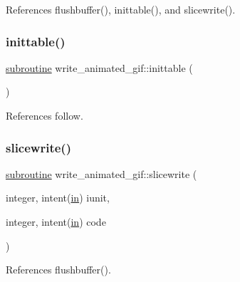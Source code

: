 References flushbuffer(), inittable(), and slicewrite().

\mbox{\label{M__writegif__animated_8f90_acd7274fbac8690a12be91b542378a4eb}} 
\subsubsection{\texorpdfstring{inittable()}{inittable()}}
{\footnotesize\ttfamily \hyperlink{M__stopwatch_83_8txt_acfbcff50169d691ff02d4a123ed70482}{subroutine} write\+\_\+animated\+\_\+gif\+::inittable (\begin{DoxyParamCaption}{ }\end{DoxyParamCaption})\hspace{0.3cm}{\ttfamily [private]}}



References follow.

\mbox{\label{M__writegif__animated_8f90_ac5c0245eea61f109cbf3ce5bbf38981b}} 
\subsubsection{\texorpdfstring{slicewrite()}{slicewrite()}}
{\footnotesize\ttfamily \hyperlink{M__stopwatch_83_8txt_acfbcff50169d691ff02d4a123ed70482}{subroutine} write\+\_\+animated\+\_\+gif\+::slicewrite (\begin{DoxyParamCaption}\item[{integer, intent(\hyperlink{M__journal_83_8txt_afce72651d1eed785a2132bee863b2f38}{in})}]{iunit,  }\item[{integer, intent(\hyperlink{M__journal_83_8txt_afce72651d1eed785a2132bee863b2f38}{in})}]{code }\end{DoxyParamCaption})\hspace{0.3cm}{\ttfamily [private]}}



References flushbuffer().

